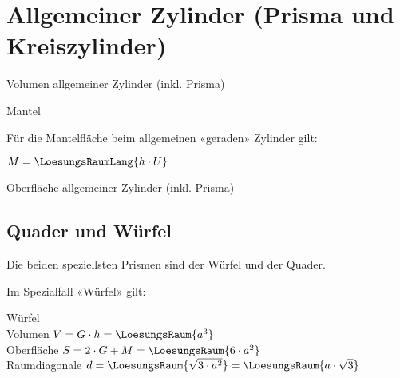 \section{Allgemeiner Zylinder (Prisma und Kreiszylinder)}


\begin{gesetz}{Volumen allgemeiner Zylinder (inkl. Prisma)}{}

  \begin{center}\end{center}
\end{gesetz}



\begin{bemerkung}{Mantel}{}
  
  Für die Mantelfläche beim allgemeinen «geraden» Zylinder gilt:

  $M = \LoesungsRaumLang{h \cdot U}$
\end{bemerkung}



\begin{gesetz}{Oberfläche allgemeiner Zylinder (inkl. Prisma)}{}

  \begin{center}\end{center}
\end{gesetz}


\newpage
\subsection{Quader und Würfel}\label{QuaderUndWuerfel}
Die beiden speziellsten Prismen sind der Würfel und der Quader.

Im Spezialfall «Würfel» gilt:
\begin{gesetz}{Würfel}{}\\
  Volumen $V = G\cdot{} h = \LoesungsRaum{a^3}$\\
  Oberfläche $S=2\cdot{}G + M = \LoesungsRaum{6\cdot{}a^2}$\\
  Raumdiagonale $d = \LoesungsRaum{\sqrt{3\cdot{}a^2}} = \LoesungsRaum{a\cdot{}\sqrt{3}}$
\end{gesetz}


